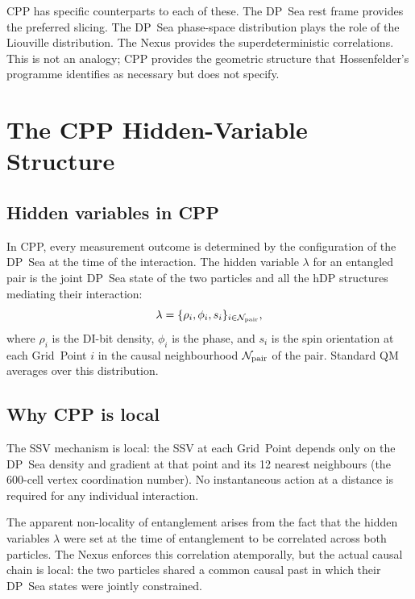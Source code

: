 \documentclass[11pt,a4paper]{article}
\begin{document}
CPP has specific counterparts to each of these.  The DP~Sea rest
frame provides the preferred slicing.  The DP~Sea phase-space
distribution plays the role of the Liouville distribution.  The
Nexus provides the superdeterministic correlations.  This is not
an analogy; CPP provides the geometric structure that Hossenfelder's
programme identifies as necessary but does not specify.

\section{The CPP Hidden-Variable Structure}

\subsection{Hidden variables in CPP}

In CPP, every measurement outcome is determined by the configuration
of the DP~Sea at the time of the interaction.  The hidden variable
$\lambda$ for an entangled pair is the joint DP~Sea state of the
two particles and all the hDP structures mediating their interaction:
\begin{equation}
\lambda = \{\rho_i, \phi_i, s_i\}_{i \in \mathcal{N}_{\rm pair}},
\label{eq:hv}
\end{equation}
where $\rho_i$ is the DI-bit density, $\phi_i$ is the phase, and
$s_i$ is the spin orientation at each Grid~Point $i$ in the causal
neighbourhood $\mathcal{N}_{\rm pair}$ of the pair.  Standard QM
averages over this distribution.

\subsection{Why CPP is local}

The SSV mechanism is local: the SSV at each Grid~Point depends only
on the DP~Sea density and gradient at that point and its 12 nearest
neighbours (the 600-cell vertex coordination number).  No
instantaneous action at a distance is required for any individual
interaction.

The apparent non-locality of entanglement arises from the fact that
the hidden variables $\lambda$ were set at the time of entanglement
to be correlated across both particles.  The Nexus enforces this
correlation atemporally, but the actual causal chain is local: the
two particles shared a common causal past in which their DP~Sea
states were jointly constrained.
\end{document}
